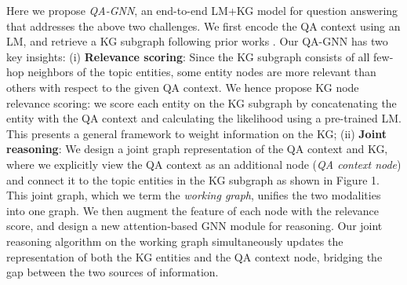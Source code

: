 \documentclass[11pt]{article}
\newcommand{\methodname}{QA-GNN\xspace}
\begin{document}
Here we propose \textit{\methodname}, an end-to-end LM+KG model for question answering that addresses the above two challenges. We first encode the QA context using an LM, and retrieve a KG subgraph following prior works \cite{feng2020scalable}. 
Our \methodname has two key insights: (i) \textbf{Relevance scoring}: Since the KG subgraph consists of all few-hop neighbors of the topic entities, some entity nodes are more relevant than others with respect to the given QA context. We hence propose KG node relevance scoring: 
we score each entity on the KG subgraph by concatenating the entity with the QA context and calculating the likelihood using a pre-trained LM. This presents a general framework to weight information on the KG; (ii) \textbf{Joint reasoning}: We design a joint graph representation of the QA context and KG, where we explicitly view the QA context as an additional node (\textit{QA context node}) and connect it to the topic entities in the KG subgraph as shown in Figure 1. 
This joint graph, which we term the \textit{working graph}, unifies the two modalities into one graph.
We then augment the feature of each node with the relevance score, and design a new attention-based GNN module for reasoning.
Our joint reasoning algorithm on the working graph simultaneously updates the representation of both the KG entities and the QA context node, bridging the gap between the two sources of information.
\end{document}
